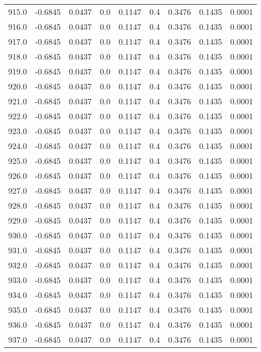 \begin{longtable}{lrrrrrrrr}
915.0 & -0.6845 & 0.0437 & 0.0 & 0.1147 & 0.4 & 0.3476 & 0.1435 & 0.0001 \\
916.0 & -0.6845 & 0.0437 & 0.0 & 0.1147 & 0.4 & 0.3476 & 0.1435 & 0.0001 \\
917.0 & -0.6845 & 0.0437 & 0.0 & 0.1147 & 0.4 & 0.3476 & 0.1435 & 0.0001 \\
918.0 & -0.6845 & 0.0437 & 0.0 & 0.1147 & 0.4 & 0.3476 & 0.1435 & 0.0001 \\
919.0 & -0.6845 & 0.0437 & 0.0 & 0.1147 & 0.4 & 0.3476 & 0.1435 & 0.0001 \\
920.0 & -0.6845 & 0.0437 & 0.0 & 0.1147 & 0.4 & 0.3476 & 0.1435 & 0.0001 \\
921.0 & -0.6845 & 0.0437 & 0.0 & 0.1147 & 0.4 & 0.3476 & 0.1435 & 0.0001 \\
922.0 & -0.6845 & 0.0437 & 0.0 & 0.1147 & 0.4 & 0.3476 & 0.1435 & 0.0001 \\
923.0 & -0.6845 & 0.0437 & 0.0 & 0.1147 & 0.4 & 0.3476 & 0.1435 & 0.0001 \\
924.0 & -0.6845 & 0.0437 & 0.0 & 0.1147 & 0.4 & 0.3476 & 0.1435 & 0.0001 \\
925.0 & -0.6845 & 0.0437 & 0.0 & 0.1147 & 0.4 & 0.3476 & 0.1435 & 0.0001 \\
926.0 & -0.6845 & 0.0437 & 0.0 & 0.1147 & 0.4 & 0.3476 & 0.1435 & 0.0001 \\
927.0 & -0.6845 & 0.0437 & 0.0 & 0.1147 & 0.4 & 0.3476 & 0.1435 & 0.0001 \\
928.0 & -0.6845 & 0.0437 & 0.0 & 0.1147 & 0.4 & 0.3476 & 0.1435 & 0.0001 \\
929.0 & -0.6845 & 0.0437 & 0.0 & 0.1147 & 0.4 & 0.3476 & 0.1435 & 0.0001 \\
930.0 & -0.6845 & 0.0437 & 0.0 & 0.1147 & 0.4 & 0.3476 & 0.1435 & 0.0001 \\
931.0 & -0.6845 & 0.0437 & 0.0 & 0.1147 & 0.4 & 0.3476 & 0.1435 & 0.0001 \\
932.0 & -0.6845 & 0.0437 & 0.0 & 0.1147 & 0.4 & 0.3476 & 0.1435 & 0.0001 \\
933.0 & -0.6845 & 0.0437 & 0.0 & 0.1147 & 0.4 & 0.3476 & 0.1435 & 0.0001 \\
934.0 & -0.6845 & 0.0437 & 0.0 & 0.1147 & 0.4 & 0.3476 & 0.1435 & 0.0001 \\
935.0 & -0.6845 & 0.0437 & 0.0 & 0.1147 & 0.4 & 0.3476 & 0.1435 & 0.0001 \\
936.0 & -0.6845 & 0.0437 & 0.0 & 0.1147 & 0.4 & 0.3476 & 0.1435 & 0.0001 \\
937.0 & -0.6845 & 0.0437 & 0.0 & 0.1147 & 0.4 & 0.3476 & 0.1435 & 0.0001 \\

\end{longtable}
